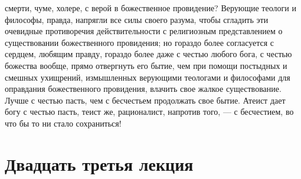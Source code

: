 \documentclass[12pt]{article}
\begin{document}
смерти, чуме, холере, с верой в божественное провидение? Верующие теологи и философы, правда, напрягли все силы своего разума, чтобы сгладить эти очевидные противоречия действительности с религиозным представлением о существовании божественного провидения; но гораздо более согласуется с сердцем, любящим правду, гораздо более даже с честью любого бога, с честью божества вообще, прямо отвергнуть его бытие, чем при помощи постыдных и смешных ухищрений, измышленных верующими теологами и философами для оправдания божественного провидения, влачить свое жалкое существование. Лучше с честью пасть, чем с бесчестьем продолжать свое бытие. Атеист дает богу с честью пасть, теист же, рационалист, напротив того, --- с бесчестием, во что бы то ни стало сохраниться! 

{}
\section*{Двадцать третья лекция}
\end{document}
